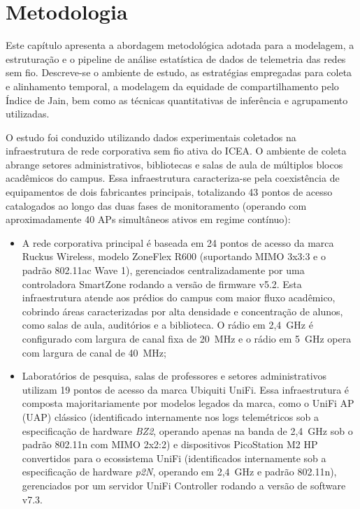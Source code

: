 \chapter{Metodologia}
\label{cap:metodologia}

Este capítulo apresenta a abordagem metodológica adotada para a modelagem, a estruturação e o pipeline de análise estatística de dados de telemetria das redes sem fio. Descreve-se o ambiente de estudo, as estratégias empregadas para coleta e alinhamento temporal, a modelagem da equidade de compartilhamento pelo Índice de Jain, bem como as técnicas quantitativas de inferência e agrupamento utilizadas.

O estudo foi conduzido utilizando dados experimentais coletados na infraestrutura de rede corporativa sem fio ativa do \ac{ICEA}. O ambiente de coleta abrange setores administrativos, bibliotecas e salas de aula de múltiplos blocos acadêmicos do campus. Essa infraestrutura caracteriza-se pela coexistência de equipamentos de dois fabricantes principais, totalizando 43 pontos de acesso catalogados ao longo das duas fases de monitoramento (operando com aproximadamente 40 APs simultâneos ativos em regime contínuo):
\begin{itemize}
	\item A rede corporativa principal é baseada em 24 pontos de acesso da marca Ruckus Wireless, modelo ZoneFlex R600 (suportando MIMO 3x3:3 e o padrão 802.11ac Wave 1), gerenciados centralizadamente por uma controladora SmartZone rodando a versão de firmware v5.2. Esta infraestrutura atende aos prédios do campus com maior fluxo acadêmico, cobrindo áreas caracterizadas por alta densidade e concentração de alunos, como salas de aula, auditórios e a biblioteca. O rádio em 2,4~GHz é configurado com largura de canal fixa de 20~MHz e o rádio em 5~GHz opera com largura de canal de 40~MHz;
	\item Laboratórios de pesquisa, salas de professores e setores administrativos utilizam 19 pontos de acesso da marca Ubiquiti UniFi. Essa infraestrutura é composta majoritariamente por modelos legados da marca, como o UniFi AP (UAP) clássico (identificado internamente nos logs telemétricos sob a especificação de hardware \textit{BZ2}, operando apenas na banda de 2,4~GHz sob o padrão 802.11n com MIMO 2x2:2) e dispositivos PicoStation M2 HP convertidos para o ecossistema UniFi (identificados internamente sob a especificação de hardware \textit{p2N}, operando em 2,4~GHz e padrão 802.11n), gerenciados por um servidor UniFi Controller rodando a versão de software v7.3.
\end{itemize}

